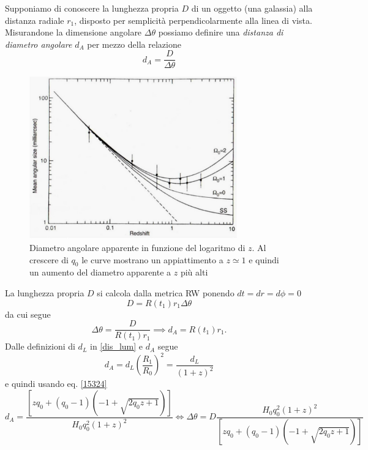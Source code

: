 Supponiamo di conoscere la lunghezza propria $D$ di un oggetto (una galassia)
alla distanza radiale $r_1$, disposto per semplicità perpendicolarmente alla
linea di vista.  Misurandone la dimensione angolare $\Delta \theta$ possiamo
definire una \emph{distanza di diametro angolare} $d_A$ per mezzo della
relazione
\begin{equation}
  d_A = \frac{D}{\Delta \theta}
\end{equation}
\begin{figure}
  \centering{}
  \includegraphics[width=0.8\textwidth]{figure/diametri_angolari_1.pdf}
  \caption{Diametro angolare apparente in funzione del logaritmo di $z$.  Al
    crescere di $q_0$ le curve mostrano un appiattimento a $z \simeq 1$ e quindi
    un aumento del diametro apparente a $z$ più alti}
  \label{diam_angolari_1}
\end{figure}
La lunghezza propria $D$ si calcola dalla metrica RW ponendo $dt=dr=d\phi=0$
\begin{equation}
  D= R(t_1) r_1 \Delta \theta
\end{equation}
da cui segue
\begin{equation}
  \Delta \theta = \frac{D} {R(t_1) r_1} \implies d_A= R(t_1) r_1.
\end{equation}
Dalle definizioni di $d_L$ in \eqref{dis_lum} e $d_A$ segue
\begin{equation}
  d_A = d_L \left( \frac{R_1}{R_0} \right)^2 = \frac{d_L}{(1+z)^2}
\end{equation}
e quindi usando eq. \eqref{15324}
\begin{equation}
  d_A = \frac { \left[ z q_0 +(q_0-1) (-1+\sqrt{2q_0z+1}) \right] }  {H_0 q^2_0
    (1+z)^2}
  \iff
  \Delta \theta  = D \frac{H_0 q^2_0 (1+z)^2} {\left[ z q_0 +(q_0-1)
      (-1+\sqrt{2q_0z+1}) \right]}
\end{equation}
